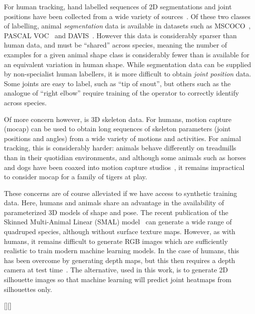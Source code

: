 For human tracking, hand labelled sequences of 2D segmentations and joint positions have been collected from a wide variety of sources~\cite{andriluka14cvpr,lin2014microsoft,johnson2010clustered}. Of these two classes of labelling, animal {\em segmentation} data is available in datasets such as MSCOCO~\cite{lin2014microsoft}, PASCAL VOC~\cite{everingham2010pascal} and DAVIS~\cite{Perazzi2016}.  However this data is considerably sparser than human data, and must be ``shared'' across species, meaning the number of examples for a given animal shape class is considerably fewer than is available for an equivalent variation in human shape.  While segmentation data can be supplied by non-specialist human labellers, it is more difficult to obtain {\em joint position} data.  Some joints are easy to label, such as ``tip of snout'', but others such as the analogue of ``right elbow'' require training of the operator to correctly identify across species.

Of more concern however, is 3D skeleton data.  For humans, motion capture (mocap) can be used to obtain long sequences of skeleton parameters (joint positions and angles) from a wide variety of motions and activities.
For animal tracking, this is considerably harder: animals behave differently on treadmills than in their quotidian environments, and although some animals such as horses and dogs have been coaxed into motion capture studios~\cite{wilhelm2015furyexplorer}, it remains impractical to consider mocap for a family of tigers at play.

These concerns are of course alleviated if we have access to synthetic training data.  Here, humans and animals share an advantage in the availability of parameterized 3D models of shape and pose.  The recent publication of the Skinned Multi-Animal Linear (SMAL) model~\cite{zuffi2017menagerie} can generate a wide range of quadruped species, although without surface texture maps.  However, as with humans, it remains difficult to generate RGB images which are sufficiently realistic to train modern machine learning models.  In the case of humans, this has been overcome by generating depth maps, but this then requires a depth camera at test time~\cite{shotton-kinect}. The alternative, used in this work, is to generate 2D silhouette images so that machine learning will predict joint heatmaps from silhouettes only.

[][\FBwidth]

\def\bb{\rule{2in}{0pt}\rule{0pt}{1in}}
\def\labelledpic#1#2{
\begin{tikzpicture}
\node (pic) {#1};
\path[fill=white,draw=gray,thick] (pic.south west) +(3ex,3ex) circle (2ex)
   node {#2};
\end{tikzpicture}
}

